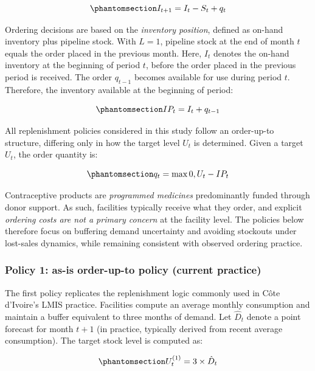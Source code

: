\documentclass[
  authoryear,
  doubleblind,
  3p]{elsarticle}
\begin{document}
\begin{equation}\phantomsection\label{eq-it}{
I_{t+1} = I_t - S_t + q_t
}\end{equation}

Ordering decisions are based on the \emph{inventory position}, defined
as on-hand inventory plus pipeline stock. With \(L=1\), pipeline stock
at the end of month \(t\) equals the order placed in the previous month.
Here, \(I_t\) denotes the on-hand inventory at the beginning of period
\(t\), before the order placed in the previous period is received. The
order \(q_{t-1}\) becomes available for use during period \(t\).
Therefore, the inventory available at the beginning of period:

\begin{equation}\phantomsection\label{eq-ip}{
IP_t = I_t + q_{t-1}
}\end{equation}

All replenishment policies considered in this study follow an
order-up-to structure, differing only in how the target level \(U_t\) is
determined. Given a target \(U_t\), the order quantity is:

\begin{equation}\phantomsection\label{eq-qp}{
q_t = \max{0, U_t - IP_t}
}\end{equation}

Contraceptive products are \emph{programmed medicines} predominantly
funded through donor support. As such, facilities typically receive what
they order, and explicit \emph{ordering costs are not a primary concern}
at the facility level. The policies below therefore focus on buffering
demand uncertainty and avoiding stockouts under lost-sales dynamics,
while remaining consistent with observed ordering practice.

\subsubsection{Policy 1: as-is order-up-to policy (current
practice)}\label{policy-1-as-is-order-up-to-policy-current-practice}

The first policy replicates the replenishment logic commonly used in
Côte d'Ivoire's LMIS practice. Facilities compute an average monthly
consumption and maintain a buffer equivalent to three months of demand.
Let \(\hat{D}_t\) denote a point forecast for month \(t+1\) (in
practice, typically derived from recent average consumption). The target
stock level is computed as:

\begin{equation}\phantomsection\label{eq-stock}{
U_t^{(1)} = 3 \times \hat{D}_t
}\end{equation}
\end{document}
